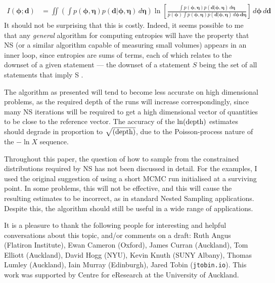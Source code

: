 \documentclass[entropy,article,accept,oneauthor,pdftex,10pt,a4paper]{mdpi}
\renewcommand{\d}{\boldsymbol{d}}
\newcommand{\bphi}{\boldsymbol{\phi}}
\newcommand{\boldeta}{\boldsymbol{\eta}}
\newcommand{\depth}{(\textnormal{depth})}
\begin{document}
\begin{align}
I(\bphi; \d) &= \iint
  \left(\int p(\bphi, \boldeta)p(\d | \bphi, \boldeta) \, d\boldeta\right)
                        \ln \left[
  \frac{\int p(\bphi, \boldeta)p(\d | \bphi, \boldeta) \, d\boldeta}
{p(\bphi)\int p(\bphi, \boldeta)p(\d | \bphi, \boldeta) \, d\bphi \, \d\boldeta}\right]
                        \, d\bphi \, d\d
\end{align}
It should not be surprising that this is costly. Indeed, it seems possible
to me that any {\em general} algorithm for computing entropies will have the
property that NS (or a similar algorithm capable of measuring small volumes)
appears in an inner loop, since entropies are sums of terms, each of which
relates to the downset of a given statement --- the downset of a statement
$S$ being the set of all statements that imply S \citep{knuth_questions}.

The algorithm as presented will tend to become less accurate on high dimensional
problems, as the required depth of the runs will increase correspondingly,
since many NS iterations will be required to get a high dimensional vector
of quantities to be close to the reference vector.
The accuracy of the $\ln\depth$ estimates should degrade in proportion to
$\sqrt{\depth}$, due to the Poisson-process nature of the $-\ln X$ sequence.

Throughout this paper, the question of how to sample from the constrained
distributions required by NS has not been discussed in detail. For the examples,
I used the original \citet{skilling} suggestion of using a short MCMC run
initialised at a surviving point. In some problems, this will not be effective,
and this will cause the resulting estimates to be incorrect, as in standard
Nested Sampling applications. Despite this, the algorithm should still be
useful in a wide range of applications.

It is a pleasure to thank the following people for interesting and helpful
conversations about this topic, and/or comments on a draft:
Ruth Angus (Flatiron Institute),
Ewan Cameron (Oxford), James Curran (Auckland), Tom Elliott (Auckland),
David Hogg (NYU), Kevin Knuth (SUNY Albany),
Thomas Lumley (Auckland),
Iain Murray (Edinburgh), Jared Tobin ({\tt jtobin.io}).
This work was supported by Centre for eResearch
at the University of Auckland.


\end{document}
